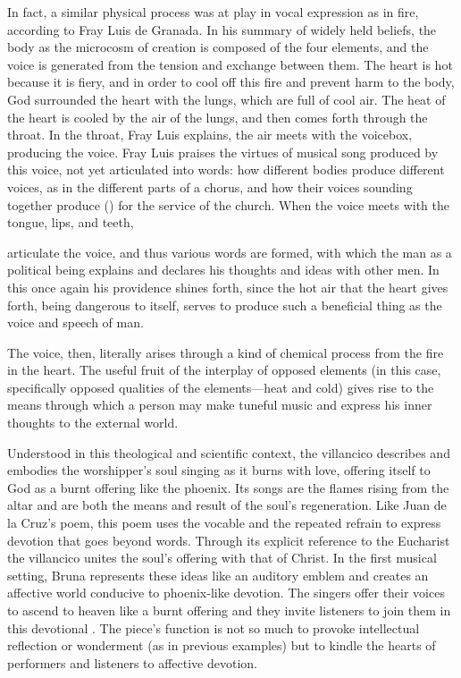 In fact, a similar physical process was at play in vocal expression as in fire,
according to Fray Luis de Granada.
In his summary of widely held beliefs, the body as the microcosm of creation
is composed of the four elements, and the voice is generated from the tension
and exchange between them.
The heart is hot because it is fiery, and in order to cool off this fire and
prevent harm to the body, God surrounded the heart with the lungs, which are
full of cool air. 
The heat of the heart is cooled by the air of the lungs, and then comes forth
through the throat.%
    \Autocite[435]{LuisdeGranada:Simbolo}
In the throat, Fray Luis explains, the air meets with the voicebox, producing
the voice.
Fray Luis praises the virtues of musical song produced by this voice, not yet
articulated into words: how different bodies produce different voices, as in
the different parts of a chorus, and how their voices sounding together produce
 () for the service of the
church.%
    \Autocite[434]{LuisdeGranada:Simbolo}
When the voice meets with the tongue, lips, and teeth, 
\begin{quoting}
     articulate the voice, and thus various words are formed,
    with which the man as a political being explains and declares his thoughts
    and ideas with other men. \Dots{} 
    In this once again his providence shines forth, since the hot air that the
    heart gives forth, being dangerous to itself, serves to produce such a
    beneficial thing as the voice and speech of man.%
        \Autocite[435]{LuisdeGranada:Simbolo}
\end{quoting}
The voice, then, literally arises through a kind of chemical process from the
fire in the heart.
The useful fruit of the interplay of opposed elements (in this case,
specifically opposed qualities of the elements---heat and cold) gives rise to
the means through which a person may make tuneful music and express his inner
thoughts to the external world.
	
Understood in this theological and scientific context, the villancico
 describes and embodies the worshipper's soul singing
as it burns with love, offering itself to God as a burnt offering like the
phoenix.
Its songs are the flames rising from the altar and are both the means and
result of the soul's regeneration.
Like Juan de la Cruz's poem, this poem uses the vocable  and the
repeated refrain  to express devotion that goes beyond words.
Through its explicit reference to the Eucharist the villancico unites the
soul's offering with that of Christ.
In the first musical setting, Bruna represents these ideas like an auditory
emblem and creates an affective world conducive to phoenix-like devotion.
The singers offer their voices to ascend to heaven like a burnt offering and
they invite listeners to join them in this devotional .
The piece's function is not so much to provoke intellectual reflection or
wonderment (as in previous examples) but to kindle the hearts of performers and
listeners to affective devotion.

